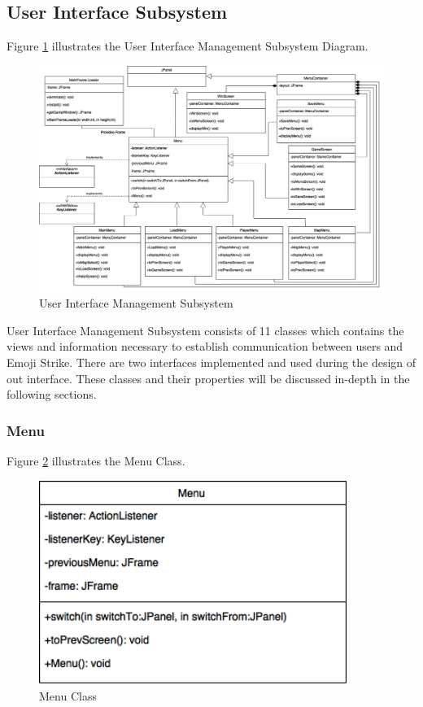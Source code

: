 \documentclass[12pt]{article} %
\begin{document}
\subsection{User Interface Subsystem}

Figure \ref{fig:views} illustrates the User Interface Management Subsystem Diagram.
\begin{figure}[h!]
   \centering
   \vspace{10pt}%
   \includegraphics[width=17cm]{views.png}
   \caption{User Interface Management Subsystem}
   \label{fig:views}
\end{figure}

User Interface Management Subsystem consists of 11 classes which contains the views and information necessary to establish communication between users and Emoji Strike.  There are two interfaces implemented and used during the design of out interface.  These classes and their properties will be discussed in-depth in the following sections.

\subsubsection{Menu}

Figure \ref{fig:menu} illustrates the Menu Class.
\begin{figure}[h!]
   \centering
   \vspace{10pt}%
   \includegraphics[width=10cm]{menu.png}
   \caption{Menu Class}
   \label{fig:menu}
\end{figure}
\end{document}

